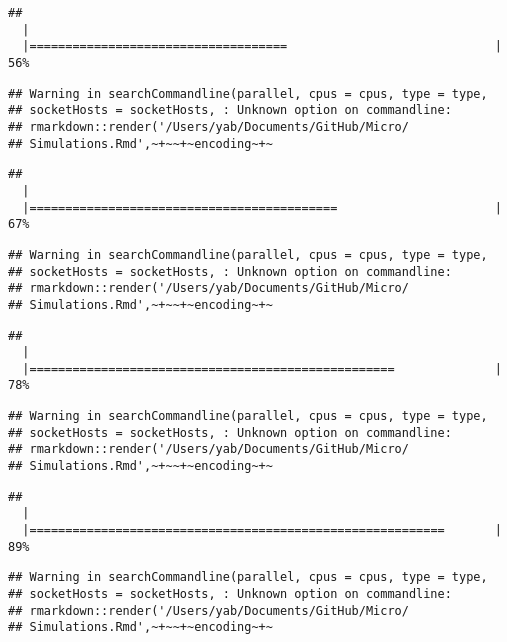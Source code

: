 \documentclass[]{article}
\begin{document}
\begin{verbatim}
## 
  |                                                                       
  |====================================                             |  56%
\end{verbatim}

\begin{verbatim}
## Warning in searchCommandline(parallel, cpus = cpus, type = type,
## socketHosts = socketHosts, : Unknown option on commandline:
## rmarkdown::render('/Users/yab/Documents/GitHub/Micro/
## Simulations.Rmd',~+~~+~encoding~+~
\end{verbatim}

\begin{verbatim}
## 
  |                                                                       
  |===========================================                      |  67%
\end{verbatim}

\begin{verbatim}
## Warning in searchCommandline(parallel, cpus = cpus, type = type,
## socketHosts = socketHosts, : Unknown option on commandline:
## rmarkdown::render('/Users/yab/Documents/GitHub/Micro/
## Simulations.Rmd',~+~~+~encoding~+~
\end{verbatim}

\begin{verbatim}
## 
  |                                                                       
  |===================================================              |  78%
\end{verbatim}

\begin{verbatim}
## Warning in searchCommandline(parallel, cpus = cpus, type = type,
## socketHosts = socketHosts, : Unknown option on commandline:
## rmarkdown::render('/Users/yab/Documents/GitHub/Micro/
## Simulations.Rmd',~+~~+~encoding~+~
\end{verbatim}

\begin{verbatim}
## 
  |                                                                       
  |==========================================================       |  89%
\end{verbatim}

\begin{verbatim}
## Warning in searchCommandline(parallel, cpus = cpus, type = type,
## socketHosts = socketHosts, : Unknown option on commandline:
## rmarkdown::render('/Users/yab/Documents/GitHub/Micro/
## Simulations.Rmd',~+~~+~encoding~+~
\end{verbatim}
\end{document}
